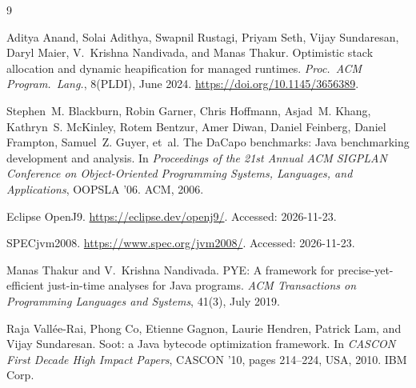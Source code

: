 \documentclass[11pt,a4paper]{report}
\begin{document}






\begin{thebibliography}{9}

Aditya Anand, Solai Adithya, Swapnil Rustagi, Priyam Seth, Vijay Sundaresan, Daryl Maier,
V.~Krishna Nandivada, and Manas Thakur.
Optimistic stack allocation and dynamic heapification for managed runtimes.
\emph{Proc.\ ACM Program.\ Lang.}, 8(PLDI), June 2024.
\url{https://doi.org/10.1145/3656389}.

Stephen~M. Blackburn, Robin Garner, Chris Hoffmann, Asjad~M. Khang, Kathryn~S. McKinley,
Rotem Bentzur, Amer Diwan, Daniel Feinberg, Daniel Frampton, Samuel~Z. Guyer, et~al.
The DaCapo benchmarks: Java benchmarking development and analysis.
In \emph{Proceedings of the 21st Annual ACM SIGPLAN Conference on Object-Oriented Programming
Systems, Languages, and Applications}, OOPSLA '06. ACM, 2006.

Eclipse OpenJ9. \url{https://eclipse.dev/openj9/}. Accessed: 2026-11-23.

SPECjvm2008. \url{https://www.spec.org/jvm2008/}. Accessed: 2026-11-23.

Manas Thakur and V.~Krishna Nandivada.
PYE: A framework for precise-yet-efficient just-in-time analyses for Java programs.
\emph{ACM Transactions on Programming Languages and Systems}, 41(3), July 2019.

Raja Vall\'ee-Rai, Phong Co, Etienne Gagnon, Laurie Hendren, Patrick Lam, and Vijay Sundaresan.
Soot: a Java bytecode optimization framework.
In \emph{CASCON First Decade High Impact Papers}, CASCON '10, pages 214--224, USA, 2010. IBM Corp.

\end{thebibliography}
\end{document}
